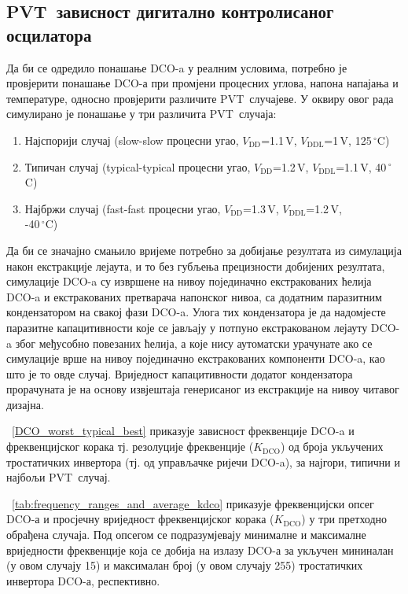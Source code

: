 \documentclass[master]{finthesis}
\def \DCO  {DCO} %
\def \PVT  {PVT} %
\begin{document}
\subsection{\PVT\ зависност дигитално контролисаног осцилатора}
Да би се одредило понашање \DCO-a у реалним условима, потребно је провјерити понашање \DCO-а при промјени процесних углова, напона напајања и температуре, односно провјерити различите \PVT\ случајеве. У оквиру овог рада симулирано је понашање у три различита \PVT\ случаја:
\begin{enumerate}
	\item Најспорији случај (slow-slow процесни угао, $V_\text{DD}$=1.1\,V, $V_\text{DDL}$=1\,V, 125\,$^{\circ}$C)
	\item Типичан случај (typical-typical процесни угао, $V_\text{DD}$=1.2\,V, $V_\text{DDL}$=1.1\,V, 40\,$^{\circ}$C)
	\item Најбржи случај (fast-fast процесни угао, $V_\text{DD}$=1.3\,V, $V_\text{DDL}$=1.2\,V, \\ -40\,$^{\circ}$C)
\end{enumerate}
Да би се значајно смањило вријеме потребно за добијање резултата из симулација након екстракције лејаута, и то без губљења прецизности добијених резултата, симулације \DCO-a су извршене на нивоу појединачно екстракованих ћелија \DCO-a и екстракованих претварача напонског нивоа, са додатним паразитним кондензатором на свакој фази \DCO-a. Улога тих кондензатора је да надомјесте паразитне капацитивности које се јављају у потпуно екстракованом лејауту \DCO-a због међусобно повезаних ћелија, а које нису аутоматски урачунате ако се симулације врше на нивоу појединачно екстракованих компоненти \DCO-a, као што је то овде случај. Вриједност капацитивности додатог кондензатора прорачуната је на основу извјештаја генерисаног из екстракције на нивоу читавог дизајна. \par 
\figurename~\ref{DCO_worst_typical_best} приказује зависност фреквенције \DCO-a и фреквенцијског корака тј. резолуције фреквенције ($K_\text{DCO}$) од броја укључених тростатичких инвертора (тј. од управљачке ријечи \DCO-a), за најгори, типични и најбољи \PVT\ случај. 

\tablename~\ref{tab:frequency_ranges_and_average_kdco} приказује фреквенцијски опсег \DCO-а и просјечну вриједност фреквенцијског корака ($K_\text{DCO}$) у три претходно обрађена случаја. Под опсегом се подразумјевају минималне и максималне вриједности фреквенције која се добија на излазу \DCO-а за укључен мининалан (у овом случају 15) и максималан број (у овом случају 255) тростатичких инвертора \DCO-а, респективно.
\end{document}
